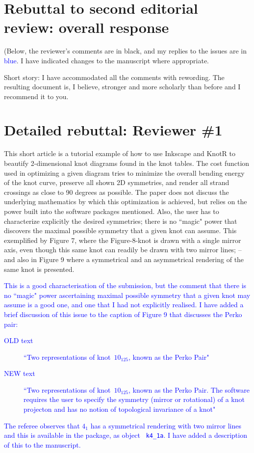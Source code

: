 \documentclass[12pt]{article}
\begin{document}
\section*{Rebuttal to second editorial review: overall response}

(Below, the reviewer's comments are in black, and my replies to the
issues are in \textcolor{blue}{blue}.  I have indicated changes to the
manuscript where appropriate.

Short story: I have accommodated all the comments with rewording.  The
resulting document is, I believe, stronger and more scholarly than
before and I recommend it to you.  


\section*{Detailed rebuttal: Reviewer \#1}

This short article is a tutorial example of how to use Inkscape and
KnotR to beautify 2-dimensional knot diagrams found in the knot
tables.  The cost function used in optimizing a given diagram tries to
minimize the overall bending energy of the knot curve, preserve all
shown 2D symmetries, and render all strand crossings as close to 90
degrees as possible.  The paper does not discuss the underlying
mathematics by which this optimization is achieved, but relies on the
power built into the software packages mentioned.  Also, the user has
to characterize explicitly the desired symmetries; there is no ``magic"
power that discovers the maximal possible symmetry that a given knot
can assume.  This exemplified by Figure 7, where the Figure-8-knot is
drawn with a single mirror axis, even though this same knot can
readily be drawn with two mirror lines; -- and also in Figure 9 where
a symmetrical and an asymmetrical rendering of the same knot is
presented.

\textcolor{blue}{This is a good characterisation of the submission,
  but the comment that there is no ``magic" power ascertaining
  maximal possible symmetry that a given knot may assume is a good
  one, and one that I had not explicitly realised.  I have added a
  brief discussion of this issue to the caption of Figure 9 that
  discusses the Perko pair:
  \begin{description}
    \item[OLD text] ``Two representations of knot~$10_{125}$, known as the 
     Perko Pair"
    \item[NEW text] ``Two representations of knot~$10_{125}$, known as the 
      Perko Pair.   The software requires the user to specify the symmetry
      (mirror or rotational) of a knot projecton and has no notion of
      topological invariance of a knot"
  \end{description}%
  The referee observes that $4_1$ has a symmetrical rendering with two
  mirror lines and this is available in the package, as object {\tt
    k4\_1a}.  I have added a description of this to the manuscript.
}
\end{document}

